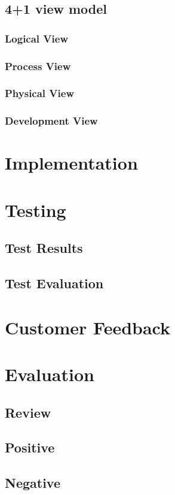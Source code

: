 \subsection{4+1 view model}
\subsubsection{Logical View}
\subsubsection{Process View}
\subsubsection{Physical View}
\subsubsection{Development View}

\section{Implementation}

\section{Testing}
\subsection{Test Results}
\subsection{Test Evaluation}

\section{Customer Feedback}

\section{Evaluation}
\subsection{Review}
\subsection{Positive}
\subsection{Negative}
